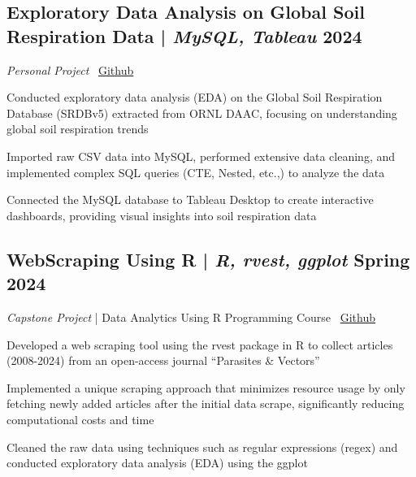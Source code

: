 \subsection{Exploratory Data Analysis on Global Soil Respiration Data \textnormal{ | \textit{MySQL, Tableau} \hfill 2024}}
\textit{Personal Project} \hfill \faCodeFork\ \href{https://github.com/vinay-ram1999/SRDBv5-Analytics}{Github}
\begin{zitemize}
    \item Conducted exploratory data analysis (EDA) on the Global Soil Respiration Database (SRDBv5) extracted from ORNL DAAC, focusing on understanding global soil respiration trends
    \item Imported raw CSV data into MySQL, performed extensive data cleaning, and implemented complex SQL queries (CTE, Nested, etc.,) to analyze the data
    \item Connected the MySQL database to Tableau Desktop to create interactive dashboards, providing visual insights into soil respiration data
\end{zitemize}


\subsection{WebScraping Using R \textnormal{ | \textit{R, rvest, ggplot} \hfill Spring 2024}}
\textit{Capstone Project} | Data Analytics Using R Programming Course \hfill \faCodeFork\ \href{https://github.com/vinay-ram1999/WebScraping-R}{Github}
\begin{zitemize}
    \item Developed a web scraping tool using the rvest package in R to collect articles (2008-2024) from an open-access journal ``Parasites \& Vectors''
    \item Implemented a unique scraping approach that minimizes resource usage by only fetching newly added articles after the initial data scrape, significantly reducing computational costs and time
    \item Cleaned the raw data using techniques such as regular expressions (regex) and conducted exploratory data analysis (EDA) using the ggplot
\end{zitemize}


